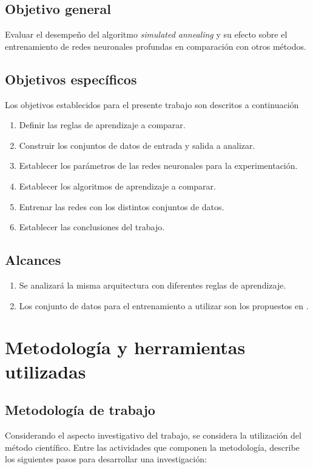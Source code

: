 \subsection{Objetivo general}
Evaluar el desempeño del algoritmo {\em simulated annealing} y su efecto sobre el entrenamiento de redes neuronales profundas en comparación con otros métodos.

\subsection{Objetivos específicos}
Los objetivos establecidos para el presente trabajo son descritos a continuación
\begin{enumerate}
	\item Definir las reglas de aprendizaje a comparar.
	\item Construir los conjuntos de datos de entrada y salida a analizar.
	\item Establecer los parámetros de las redes neuronales para la experimentación.
	\item Establecer los algoritmos de aprendizaje a comparar.
	\item Entrenar las redes con los distintos conjuntos de datos.
	\item Establecer las conclusiones del trabajo.
\end{enumerate}

\subsection{Alcances}
\begin{enumerate}
	\item Se analizará la misma arquitectura con diferentes reglas de aprendizaje.
	\item Los conjunto de datos para el entrenamiento a utilizar son los propuestos en \cite{Morse2016}.
\end{enumerate}

\section{Metodología y herramientas utilizadas}
\subsection{Metodología de trabajo}
Considerando el aspecto investigativo del trabajo, se considera la utilización del método científico. Entre las actividades que componen la metodología,  describe los siguientes pasos para desarrollar una investigación:

